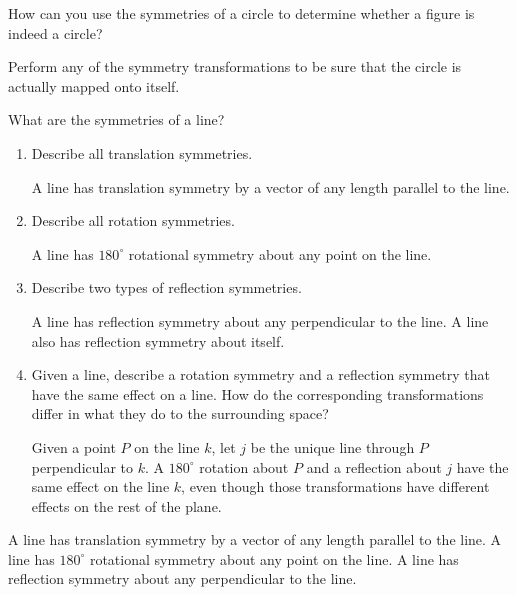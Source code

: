 \documentclass[nooutcomes]{ximera}
\begin{document}
\begin{question}
How can you use the symmetries of a circle to determine whether a figure is indeed a circle?  
\begin{freeResponse}
\begin{hint}
Perform any of the symmetry transformations to be sure that the circle is actually mapped onto itself.  
\end{hint}
\end{freeResponse}
\end{question}

\begin{question}
What are the symmetries of a line?  
\begin{enumerate}
\item Describe all translation symmetries.  
\begin{freeResponse}
\begin{hint}
A line has translation symmetry by a vector of any length parallel to the line.   
\end{hint}
\end{freeResponse}
\item Describe all rotation symmetries.
\begin{freeResponse}
\begin{hint}
A line has $180^\circ$ rotational symmetry about any point on the line.  
\end{hint}
\end{freeResponse}
\item Describe two types of reflection symmetries.
\begin{freeResponse}
\begin{hint}
A line has reflection symmetry about any perpendicular to the line.  A line also has reflection symmetry about itself.  
\end{hint}
\end{freeResponse}
\item Given a line, describe a rotation symmetry and a reflection symmetry that have the same effect on a line.  How do the corresponding transformations differ in what they do to the surrounding space?  
\begin{freeResponse}
\begin{hint}
Given a point $P$ on the line $k$, let $j$ be the unique line through $P$ perpendicular to $k$.  A $180^\circ$ rotation about $P$ and a reflection about $j$ have the same effect on the line $k$, even though those transformations have different effects on the rest of the plane.  
\end{hint}
\end{freeResponse}
\end{enumerate}
\begin{freeResponse}
\begin{hint}
A line has translation symmetry by a vector of any length parallel to the line.  A line has $180^\circ$ rotational symmetry about any point on the line.  A line has reflection symmetry about any perpendicular to the line.  
\end{hint}
\end{freeResponse}
\end{question}
\end{document}
